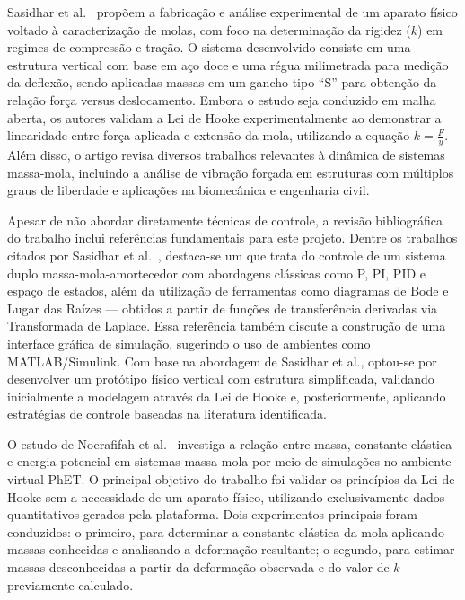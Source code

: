 \documentclass[9pt,a4paper,twocolumn,twoside]{tau-class/tau}
\begin{document}
    Sasidhar et al.~\cite{sasidhar2025} propõem a fabricação e análise experimental de um aparato físico voltado à caracterização de molas, com foco na determinação da rigidez ($k$) em regimes de compressão e tração. O sistema desenvolvido consiste em uma estrutura vertical com base em aço doce e uma régua milimetrada para medição da deflexão, sendo aplicadas massas em um gancho tipo “S” para obtenção da relação força versus deslocamento. Embora o estudo seja conduzido em malha aberta, os autores validam a Lei de Hooke experimentalmente ao demonstrar a linearidade entre força aplicada e extensão da mola, utilizando a equação $k = \frac{F}{y}$. Além disso, o artigo revisa diversos trabalhos relevantes à dinâmica de sistemas massa-mola, incluindo a análise de vibração forçada em estruturas com múltiplos graus de liberdade e aplicações na biomecânica e engenharia civil.

    Apesar de não abordar diretamente técnicas de controle, a revisão bibliográfica do trabalho inclui referências fundamentais para este projeto. Dentre os trabalhos citados por Sasidhar et al.~\cite{sasidhar2025}, destaca-se um que trata do controle de um sistema duplo massa-mola-amortecedor com abordagens clássicas como P, PI, PID e espaço de estados, além da utilização de ferramentas como diagramas de Bode e Lugar das Raízes — obtidos a partir de funções de transferência derivadas via Transformada de Laplace. Essa referência também discute a construção de uma interface gráfica de simulação, sugerindo o uso de ambientes como MATLAB/Simulink. Com base na abordagem de Sasidhar et al., optou-se por desenvolver um protótipo físico vertical com estrutura simplificada, validando inicialmente a modelagem através da Lei de Hooke e, posteriormente, aplicando estratégias de controle baseadas na literatura identificada.

    O estudo de Noerafifah et al.~\cite{noerafifah2025} investiga a relação entre massa, constante elástica e energia potencial em sistemas massa-mola por meio de simulações no ambiente virtual PhET. O principal objetivo do trabalho foi validar os princípios da Lei de Hooke sem a necessidade de um aparato físico, utilizando exclusivamente dados quantitativos gerados pela plataforma. Dois experimentos principais foram conduzidos: o primeiro, para determinar a constante elástica da mola aplicando massas conhecidas e analisando a deformação resultante; o segundo, para estimar massas desconhecidas a partir da deformação observada e do valor de $k$ previamente calculado.
\end{document}
